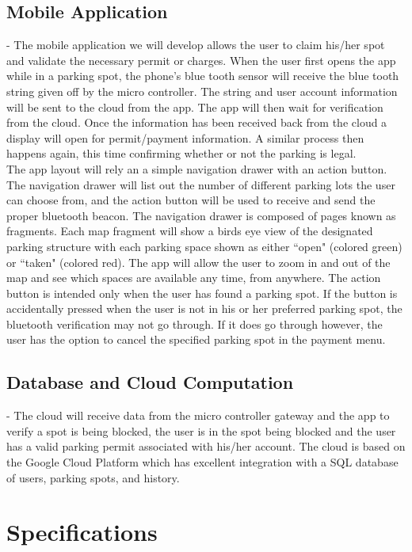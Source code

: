 \documentclass{article}
\begin{document}
\subsection{\textbf{Mobile Application}} - The mobile application we will develop allows the user to claim his/her spot and validate the necessary permit or charges. When the user first opens the app while in a parking spot, the phone's blue tooth sensor will receive the blue tooth string given off by the micro controller. The string and user account information will be sent to the cloud from the app. The app will then wait for verification from the cloud. Once the information has been received back from the cloud a display will open for permit/payment information. A similar process then happens again, this time confirming whether or not the parking is legal.
\\
The app layout will rely an a simple navigation drawer with an action button. The navigation drawer will list out the number of different parking lots the user can choose from, and the action button will be used to receive and send the proper bluetooth beacon. The navigation drawer is composed of pages known as fragments. Each map fragment will show a birds eye view of the designated parking structure with each parking space shown as either ``open" (colored green) or ``taken" (colored red). The app will allow the user to zoom in and out of the map and see which spaces are available any time, from anywhere. The action button is intended only when the user has found a parking spot. If the button is accidentally pressed when the user is not in his or her preferred parking spot, the bluetooth verification may not go through. If it does go through however, the user has the option to cancel the specified parking spot in the payment menu.

\subsection{\textbf{Database and Cloud Computation}} - The cloud will receive data from the micro controller gateway and the app to verify a spot is being blocked, the user is in the spot being blocked and the user has a valid parking permit associated with his/her account. The cloud is based on the Google Cloud Platform which has excellent integration with a SQL database of users, parking spots, and history.

\section{Specifications}
\end{document}

